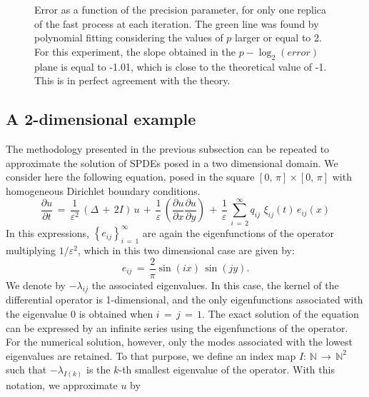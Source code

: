 \begin{figure}[h!]
    \begin{center}
        
    \end{center} 
    \caption{Error as a function of the precision parameter, for only one replica of the fast process at each iteration. The green line was found by polynomial fitting considering the values of $p$ larger or equal to 2. For this experiment, the slope obtained in the $p-\log_2(error)$ plane is equal to -1.01, which is close to the theoretical value of -1. This is in perfect agreement with the theory.} 
    \label{fig: spde error}
\end{figure}
%
\subsection{A 2-dimensional example}
\label{sub:numerical_example 2D}
The methodology presented in the previous subsection can be repeated to approximate the solution of SPDEs posed in a two dimensional domain. We consider here the following equation, posed in the square $ [ 0,\,{\pi}]{\times}[ 0,\,{\pi}]$ with homogeneous Dirichlet boundary conditions. 
\begin{equation*}
    \frac{{\partial}u}{{\partial}t} \,=\,\frac{1}{{\varepsilon}^2}\, \left( {\Delta}\,+\,2I\right)\,u \,+\, \frac{1}{\varepsilon} \, \left(\frac{{\partial}u}{{\partial}x}\frac{{\partial}u}{{\partial}y}\right) \, +\, \frac{1}{\varepsilon} \, \sum_{ i\,=\,2}^{ {\infty}}  q_{ij}\,\,{\xi}_{ij}(t)\, e_{ij}(x) 
\end{equation*}
In this expressions, $\left\{e_{ij}\right\}_{i\,=\,1}^{\infty}$ are again the eigenfunctions of the operator multiplying $1/{\varepsilon}^2$, which in this two dimensional case are given by:
\begin{equation*}
    e_{ij} \,=\, \frac{2}{\pi} \sin\left(i x\right) \, \sin\left(j y\right).
\end{equation*}
We denote by $-{\lambda}_{ ij }$ the associated eigenvalues. In this case, the kernel of the differential operator is 1-dimensional, and the only eigenfunctions associated with the eigenvalue 0 is obtained when $i\,=\,j\,=\,1$. The exact solution of the equation can be expressed by an infinite series using the eigenfunctions of the operator. For the numerical solution, however, only the modes associated with the lowest eigenvalues are retained. To that purpose, we define an index map $I: \, \mathbb N\, \to \, \mathbb N^2$ such that $-{\lambda}_{I(k)}$ is the $k$-th smallest eigenvalue of the operator. With this notation, we approximate $u$ by
